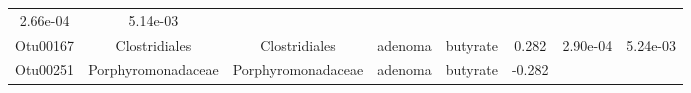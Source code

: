 \documentclass[11pt,]{article}
\begin{document}
\begin{longtable}[]{@{}cccccccc@{}}
\begin{minipage}[t]{0.08\columnwidth}
2.66e-04\strut
\end{minipage} & \begin{minipage}[t]{0.08\columnwidth}\centering\strut
5.14e-03\strut
\end{minipage}\tabularnewline
\begin{minipage}[t]{0.08\columnwidth}\centering\strut
Otu00167\strut
\end{minipage} & \begin{minipage}[t]{0.15\columnwidth}\centering\strut
Clostridiales\strut
\end{minipage} & \begin{minipage}[t]{0.15\columnwidth}\centering\strut
Clostridiales\strut
\end{minipage} & \begin{minipage}[t]{0.08\columnwidth}\centering\strut
adenoma\strut
\end{minipage} & \begin{minipage}[t]{0.09\columnwidth}\centering\strut
butyrate\strut
\end{minipage} & \begin{minipage}[t]{0.07\columnwidth}\centering\strut
0.282\strut
\end{minipage} & \begin{minipage}[t]{0.08\columnwidth}\centering\strut
2.90e-04\strut
\end{minipage} & \begin{minipage}[t]{0.08\columnwidth}\centering\strut
5.24e-03\strut
\end{minipage}\tabularnewline
\begin{minipage}[t]{0.08\columnwidth}\centering\strut
Otu00251\strut
\end{minipage} & \begin{minipage}[t]{0.15\columnwidth}\centering\strut
Porphyromonadaceae\strut
\end{minipage} & \begin{minipage}[t]{0.15\columnwidth}\centering\strut
Porphyromonadaceae\strut
\end{minipage} & \begin{minipage}[t]{0.08\columnwidth}\centering\strut
adenoma\strut
\end{minipage} & \begin{minipage}[t]{0.09\columnwidth}\centering\strut
butyrate\strut
\end{minipage} & \begin{minipage}[t]{0.07\columnwidth}\centering\strut
-0.282\strut
\end{minipage} & \begin{minipage}[t]{0.08\columnwidth}\centering\strut

\end{minipage}
\end{longtable}
\end{document}
